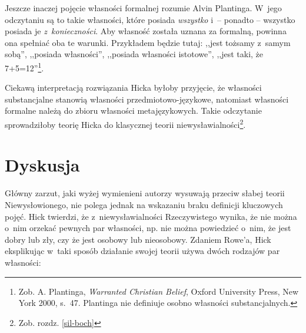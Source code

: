 Jeszcze inaczej pojęcie własności formalnej rozumie Alvin Plantinga. W~jego odczytaniu są to takie własności, które posiada \textit{wszystko} i~-- ponadto -- wszystko posiada je \textit{z~konieczności}. Aby własność została uznana za formalną, powinna ona spełniać oba te warunki. Przykładem będzie tutaj: ,,jest tożsamy z~samym sobą'', ,,posiada własności'', ,,posiada własności istotowe'', ,,jest taki, że 7+5=12''\footnote{Zob. A. Plantinga, \textit{Warranted Christian Belief}, Oxford University Press, New York 2000, s.~47. Plantinga nie definiuje osobno własności substancjalnych.}.

Ciekawą interpretacją rozwiązania Hicka byłoby przyjęcie, że własności substancjalne stanowią własności przedmiotowo-językowe, natomiast własności formalne należą do zbioru własności metajęzykowych. Takie odczytanie sprowadziłoby teorię Hicka do klasycznej teorii niewysławialności\footnote{Zob. rozdz. \ref{sil-boch}}.


\section{Dyskusja}

Główny zarzut, jaki wyżej wymienieni autorzy wysuwają przeciw słabej teorii Niewysłowionego, nie polega jednak na wskazaniu braku definicji kluczowych pojęć.
Hick twierdzi, że z~niewysławialności Rzeczywistego wynika, że nie można o~nim orzekać pewnych par własności, np. nie można powiedzieć o~nim, że jest dobry lub zły, czy że jest osobowy lub nieosobowy. Zdaniem Rowe'a, Hick eksplikując w~taki sposób działanie swojej teorii używa dwóch rodzajów par własności:

